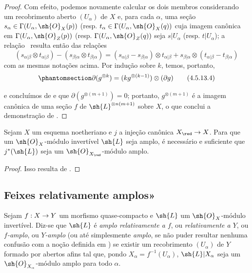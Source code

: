 \documentclass[oneside,10pt]{amsart}
\makeatletter
\newcommand{\ega@arrow}[2]{\mathchoice{#1}{#2}{#2}{#2}}
\renewcommand{\to}{\ega@arrow{\longrightarrow}{\rightarrow}}
\newcommand{\oldpage}[2][]{\marginnote{\normalfont\footnotesize\textbf{#1}~|~#2}\ignorespaces}
\let\EGAOriginalLabel\label
\renewcommand{\label}[1]{\phantomsection\EGAOriginalLabel{#1}}
\makeatother
\begin{document}
\begin{proof}
  Com efeito, podemos novamente calcular os dois membros considerando um recobrimento aberto $(U_\alpha)$ de $X$ e, para cada $\alpha$, uma seção $s_\alpha\in\Gamma(U_\alpha,\sh{O}_X(p))$ (resp. $t_\alpha\in\Gamma(U_\alpha,\sh{O}_X(q))$ cuja imagem canônica em $\Gamma(U_\alpha,\sh{O}_Z(p))$ (resp. $\Gamma(U_\alpha,\sh{O}_Z(q))$ seja $s|U_\alpha$ (resp. $t|U_\alpha$);
  a relação~ resulta então das relações
  \[
    (s_{\alpha|\beta}\otimes t_{\alpha|\beta})-(s_{\beta|\alpha}\otimes t_{\beta|\alpha})
    =(s_{\alpha|\beta}-s_{\beta|\alpha})\otimes t_{\alpha|\beta}+s_{\beta|\alpha}\otimes(t_{\alpha|\beta}-t_{\beta|\alpha})
  \]
  com as mesmas notações acima.
  Por indução sobre $k$, temos, portanto,
  \[
  \label{II.4.5.13.4}
    \partial(g^{\otimes k})=(kg^{\otimes(k-1)})\otimes(\partial g)
  \tag{4.5.13.4}
  \]

\oldpage[II]{89}
  e concluímos de  e  que $\partial(g^{\otimes(m+1)})=0$;
  portanto, $g^{\otimes(m+1)}$ é a imagem canônica de uma seção $f$ de $\sh{L}^{\otimes n(m+1)}$ sobre $X$, o que conclui a demonstração de .
\end{proof}

\begin{corollary}[4.5.14]
\label{II.4.5.14}
Sejam $X$ um esquema noetheriano e $j$ a injeção canônica $X_\red\to X$.
Para que um $\sh{O}_X$-módulo invertível $\sh{L}$ seja amplo, é necessário e suficiente que $j^*(\sh{L})$ seja um $\sh{O}_{X_\red}$-módulo amplo.
\end{corollary}

\begin{proof}
Isso resulta de .
\end{proof}


\subsection{Feixes relativamente amplos»}
\label{subsection:II.4.6}

\begin{definition}[4.6.1]
\label{II.4.6.1}
Sejam $f:X\to Y$ um morfismo quase-compacto e $\sh{L}$ um $\sh{O}_X$-módulo invertível.
Diz-se que $\sh{L}$ é \emph{amplo relativamente a $f$}, ou \emph{relativamente a $Y$}, ou \emph{$f$-amplo}, ou \emph{$Y$-amplo} (ou até simplesmente \emph{amplo}, se não puder resultar nenhuma confusão com a noção definida em ) se existir um recobrimento $(U_\alpha)$ de $Y$ formado por abertos afins tal que, pondo $X_\alpha=f^{-1}(U_\alpha)$, $\sh{L}|X_\alpha$ seja um $\sh{O}_{X_\alpha}$-módulo amplo para todo $\alpha$.
\end{definition}
\end{document}
